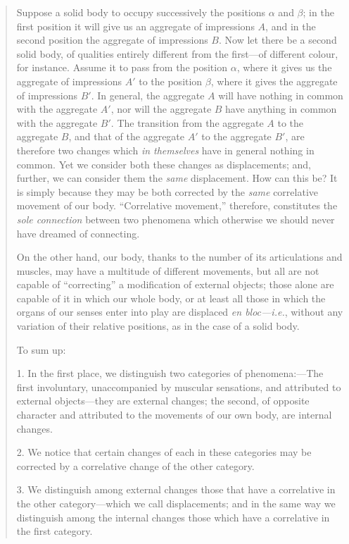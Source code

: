 \begin{quote}
    Suppose a solid body to occupy successively the positions $\alpha$ and $\beta$; in the first position it will give us an aggregate of impressions $A$, and in the second position the aggregate of impressions $B$.  Now let there be a second solid body, of qualities entirely different from the first---of different colour, for instance.  Assume it to pass from the position $\alpha$, where it gives us the aggregate of impressions $A'$ to the position $\beta$, where it gives the aggregate of impressions $B'$.  In general, the aggregate $A$ will have nothing in common with the aggregate $A'$, nor will the aggregate $B$ have anything in common with the aggregate $B'$.  The transition from the aggregate $A$ to the aggregate $B$, and that of the aggregate $A'$ to the aggregate $B'$, are therefore two changes which \emph{in themselves} have in general nothing in common.  Yet we consider both these changes as displacements; and, further, we can consider them the \emph{same} displacement.  How can this be?  It is simply because they may be both corrected by the \emph{same} correlative movement of our body.  ``Correlative movement,'' therefore, constitutes the \emph{sole connection} between two phenomena which otherwise we should never have dreamed of connecting.  
    
    On the other hand, our body, thanks to the number of its articulations and muscles, may have a multitude of different movements, but all are not capable of ``correcting'' a modification of external objects; those alone are capable of it in which our whole body, or at least all those in which the organs of our senses enter into play are displaced \emph{en bloc---i.e.}, without any variation of their relative positions, as in the case of a solid body.  
    
    To sum up: 
    
    1.  In the first place, we distinguish two categories of phenomena:---The first involuntary, unaccompanied by muscular sensations, and attributed to external objects---they are external changes; the second, of opposite character and attributed to the movements of our own body, are internal changes.
    
    2.  We notice that certain changes of each in these categories may be corrected by a correlative change of the other category.
    
    3.  We distinguish among external changes those that have a correlative in the other category---which we call displacements; and in the same way we distinguish among the internal changes those which have a correlative in the first category.
    

\end{quote}
